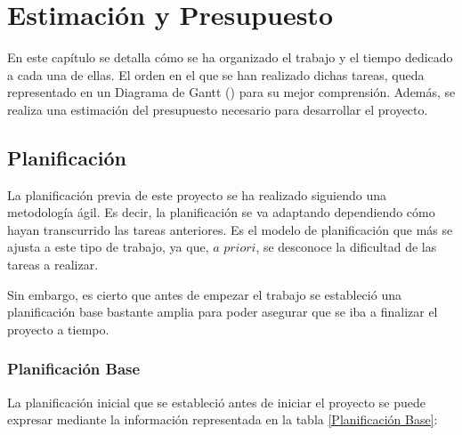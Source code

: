 \chapter{Estimación y Presupuesto}

En este capítulo se detalla cómo se ha organizado el trabajo y el tiempo dedicado a cada una de ellas. 
El orden en el que se han realizado dichas tareas, queda representado en un Diagrama de Gantt () para su mejor comprensión.
Además, se realiza una estimación del presupuesto necesario para desarrollar el proyecto.

\section{Planificación}

La planificación previa de este proyecto se ha realizado siguiendo una metodología ágil. 
Es decir, la planificación se va adaptando dependiendo cómo hayan transcurrido las tareas anteriores. 
Es el modelo de planificación que más se ajusta a este tipo de trabajo, ya que, $\textit{a priori}$, se desconoce la dificultad de las tareas a realizar. 

Sin embargo, es cierto que antes de empezar el trabajo se estableció una planificación base bastante amplia para poder asegurar que se iba a finalizar el proyecto a tiempo. 

\subsection{Planificación Base}

La planificación inicial que se estableció antes de iniciar el proyecto se puede expresar mediante la información representada en la tabla \ref{Planificación Base}:

